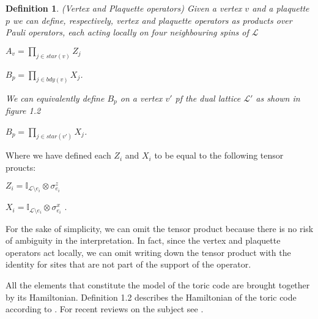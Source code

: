 \documentclass{Configuration_Files/PoliMi3i_thesis}
\newtheorem{definition}{Definition}[chapter]
\begin{document}

\begin{definition} (Vertex and Plaquette operators) Given a vertex $v$ and a plaquette $p$ we can define, respectively, vertex and plaquette operators as products over Pauli operators, each acting locally on four neighbouring spins of $\mathcal{L}$
	
\begin{center}
	$ A_v = \prod_{j \in star(v)} Z_j $ 
	
	$ B_p = \prod_{j \in bdy(v)} X_j $.
\end{center}

We can equivalently define $B_p$ on a vertex $v'$ pf the dual lattice $\mathcal{L'}$ as shown in figure 1.2

\begin{center}
	$ B_p = \prod_{j \in star(v')} X_j $.
\end{center}

\end{definition}

Where we have defined each $Z_i$ and $X_i$ to be equal to the following tensor proucts:

\begin{center}
	
	$Z_i = \mathbb{I}_{\mathcal{L} \setminus  e_i} \otimes \sigma^z_{e_i}$ 
	
	$X_i = \mathbb{I}_{\mathcal{L} \setminus  e_i} \otimes \sigma^x_{e_i} $ .
	
\end{center}


For the sake of simplicity, we can omit the tensor product because there is no risk of ambiguity in the interpretation. In fact, since the vertex and plaquette operators act locally, we can omit writing down the tensor product with the identity for sites that are not part of the support of the operator. 
 



All the elements that constitute the model of the toric code are brought together by its Hamiltonian. Definition 1.2 describes the Hamiltonian of the toric code 
{according to \cite{Kit02}}. For recent reviews on the subject see \cite{Her20}.
\end{document}
